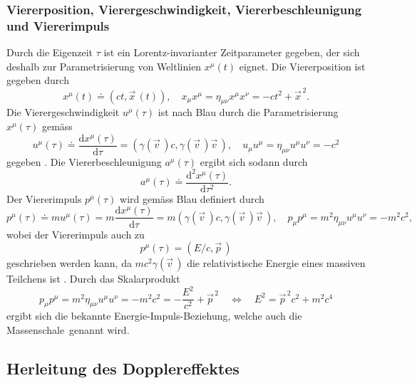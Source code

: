 \documentclass[a4paper,12pt]{article}
\numberwithin{equation}{section}
\begin{document}
\subsubsection{Viererposition, Vierergeschwindigkeit, Viererbeschleunigung und Viererimpuls}
Durch die Eigenzeit $\tau$ ist ein Lorentz-invarianter Zeitparameter gegeben, der sich deshalb zur Parametrisierung von Weltlinien $x^\mu(t)$ eignet. Die Viererposition ist gegeben durch \begin{equation}\label{viererposition}
x^\mu(t) \doteq (ct,\vec{x}\,(t)), \quad x_\mu x^\mu = \eta_{\mu\nu}x^\mu x^\nu = -ct^2 + \vec{x}^{\,2}.
\end{equation} Die Vierergeschwindigkeit $u^\mu(\tau)$ ist nach Blau durch die Parametrisierung $x^\mu(\tau)$ gemäss \begin{equation}\label{vierergeschwindigkeit}
u^\mu(\tau) \doteq \frac{\mathrm{d}x^\mu(\tau)}{\mathrm{d}\tau} = (\gamma(\vec{v}\,)c,\gamma(\vec{v}\,)\vec{v}\,), \quad u_\mu u^\mu = \eta_{\mu\nu}u^\mu u^\nu = -c^2
\end{equation} gegeben \cite[S.34]{Blau.2021}. Die Viererbeschleunigung $a^\mu(\tau)$ ergibt sich sodann durch \begin{equation}\label{viererbeschleunigung}
a^\mu(\tau) \doteq \frac{\mathrm{d}^2x^\mu(\tau)}{\mathrm{d}\tau^2}.
\end{equation} Der Viererimpuls $p^\mu(\tau)$ wird gemäss Blau definiert durch \begin{equation}\label{viererimpuls}
p^\mu(\tau) \doteq mu^\mu(\tau) = m\frac{\mathrm{d}x^\mu(\tau)}{\mathrm{d}\tau} = m(\gamma(\vec{v}\,)c,\gamma(\vec{v}\,)\vec{v}\,), \quad p_\mu p^\mu = m^2\eta_{\mu\nu}u^\mu u^\nu = -m^2c^2,
\end{equation} wobei der Viererimpuls auch zu \begin{equation}
p^\mu(\tau) = (E/c, \vec{p}\,)
\end{equation} geschrieben werden kann, da $mc^2\gamma(\vec{v}\,)$ die relativistische Energie eines massiven Teilchens ist \cite[S.36]{Blau.2021}. Durch das Skalarprodukt \begin{equation}
p_\mu p^\mu = m^2\eta_{\mu\nu}u^\mu u^\nu = -m^2c^2 = -\frac{E^2}{c^2} + \vec{p}^{\,2} \quad \Leftrightarrow \quad E^2 = \vec{p}^{\,2}c^2 + m^2c^4
\end{equation} ergibt sich die bekannte Energie-Impuls-Beziehung, welche auch die \flqq Massenschale\frqq\ genannt wird.

\subsection{Herleitung des Dopplereffektes}
\end{document}
